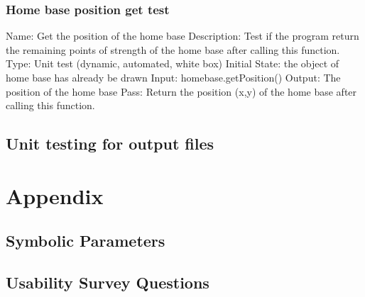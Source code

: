 \documentclass{article}
\begin{document}
\subsubsection{Home base position get test}
Name:  Get the position of the home base\newline
Description: Test if the program return the remaining points of strength of the home base after calling this function. \newline
Type: Unit test (dynamic, automated, white box) \newline
Initial State:  the object of home base has already be drawn\newline
Input: homebase.getPosition()\newline
Output: The position of the home base\newline
Pass:  Return the position (x,y) of the home base after calling this function. \newline


\subsection{Unit testing for output files}

\section{Appendix}
\subsection{Symbolic Parameters}
\subsection{Usability Survey Questions}
\end{document}
